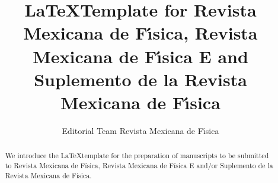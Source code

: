 \documentclass{rmf-d}
\begin{document}

%
%
\title{  \LaTeX Template for Revista Mexicana de F\'{\i}sica, Revista Mexicana de F\'{\i}sica E and Suplemento de la Revista Mexicana de F\'{\i}sica
\vspace{-6pt}}
\author{  Editorial Team Revista Mexicana de F\'{\i}sica       }
\address{   Sociedad Mexicana de F\'{\i}sica A.C., Departamento de Física, 2º Piso, Facultad de Ciencias, Universidad Nacional Autónoma de México, Ciudad Universitaria, Alcaldía Coyacán, C.P. 04510 , Ciudad de México. Apartado Postal 70-348.    }
%
%
\author{ }
\address{ }
\author{ }
\address{ }
\author{ }
\address{ }
\author{ }
\address{ }
\author{ }
\address{ }
\maketitle
%
%
\begin{abstract}
\vspace{1em} 
%
%
We introduce the \LaTeX  template for the preparation of manuscripts to be submitted to Revista Mexicana de Física, Revista Mexicana de Física E and/or Suplemento de la Revista Mexicana de Física.
\vspace{1em}
\end{abstract}
\keys{ \bf{\textit{%
}} \vspace{-8pt}}
\end{document}
